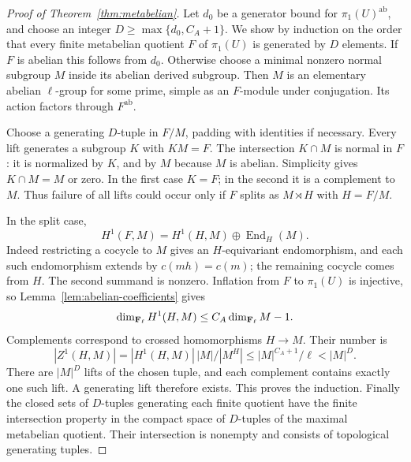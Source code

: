 \begin{proof}[Proof of Theorem~\ref{thm:metabelian}]
Let $d_0$ be a generator bound for $\pi_1(U)^{\mathrm{ab}}$, and choose an integer $D\geq\max\{d_0,C_A+1\}$. We show by induction on the order that every finite metabelian quotient $F$ of $\pi_1(U)$ is generated by $D$ elements. If $F$ is abelian this follows from $d_0$. Otherwise choose a minimal nonzero normal subgroup $M$ inside its abelian derived subgroup. Then $M$ is an elementary abelian $\ell$-group for some prime, simple as an $F$-module under conjugation. Its action factors through $F^{\mathrm{ab}}$.

Choose a generating $D$-tuple in $F/M$, padding with identities if necessary. Every lift generates a subgroup $K$ with $KM=F$. The intersection $K\cap M$ is normal in $F$: it is normalized by $K$, and by $M$ because $M$ is abelian. Simplicity gives $K\cap M=M$ or zero. In the first case $K=F$; in the second it is a complement to $M$. Thus failure of all lifts could occur only if $F$ splits as $M\rtimes H$ with $H=F/M$.

In the split case,
\[
 H^1(F,M)=H^1(H,M)\oplus\operatorname{End}_H(M).
\]
Indeed restricting a cocycle to $M$ gives an $H$-equivariant endomorphism, and each such endomorphism extends by $c(mh)=c(m)$; the remaining cocycle comes from $H$. The second summand is nonzero. Inflation from $F$ to $\pi_1(U)$ is injective, so Lemma~\ref{lem:abelian-coefficients} gives
\[
 \dim_{\mathbf F_\ell}H^1(H,M)\leq C_A\dim_{\mathbf F_\ell}M-1.
\]
Complements correspond to crossed homomorphisms $H\to M$. Their number is
\[
 |Z^1(H,M)|=|H^1(H,M)|\,|M|/|M^H|
       \leq |M|^{C_A+1}/\ell < |M|^D.
\]
There are $|M|^D$ lifts of the chosen tuple, and each complement contains exactly one such lift. A generating lift therefore exists. This proves the induction. Finally the closed sets of $D$-tuples generating each finite quotient have the finite intersection property in the compact space of $D$-tuples of the maximal metabelian quotient. Their intersection is nonempty and consists of topological generating tuples.
\end{proof}
